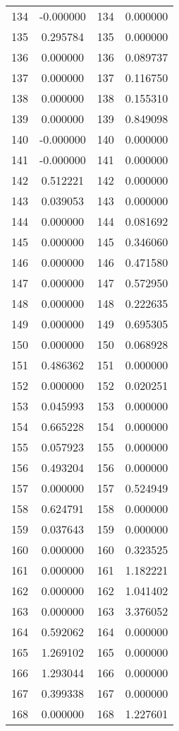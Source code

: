 \documentclass[12pt]{article}
\begin{document}
\begin{longtable}{@{}cccc@{}}
134 & -0.000000 & 134 & 0.000000 \\
135 & 0.295784 & 135 & 0.000000 \\
136 & 0.000000 & 136 & 0.089737 \\
137 & 0.000000 & 137 & 0.116750 \\
138 & 0.000000 & 138 & 0.155310 \\
139 & 0.000000 & 139 & 0.849098 \\
140 & -0.000000 & 140 & 0.000000 \\
141 & -0.000000 & 141 & 0.000000 \\
142 & 0.512221 & 142 & 0.000000 \\
143 & 0.039053 & 143 & 0.000000 \\
144 & 0.000000 & 144 & 0.081692 \\
145 & 0.000000 & 145 & 0.346060 \\
146 & 0.000000 & 146 & 0.471580 \\
147 & 0.000000 & 147 & 0.572950 \\
148 & 0.000000 & 148 & 0.222635 \\
149 & 0.000000 & 149 & 0.695305 \\
150 & 0.000000 & 150 & 0.068928 \\
151 & 0.486362 & 151 & 0.000000 \\
152 & 0.000000 & 152 & 0.020251 \\
153 & 0.045993 & 153 & 0.000000 \\
154 & 0.665228 & 154 & 0.000000 \\
155 & 0.057923 & 155 & 0.000000 \\
156 & 0.493204 & 156 & 0.000000 \\
157 & 0.000000 & 157 & 0.524949 \\
158 & 0.624791 & 158 & 0.000000 \\
159 & 0.037643 & 159 & 0.000000 \\
160 & 0.000000 & 160 & 0.323525 \\
161 & 0.000000 & 161 & 1.182221 \\
162 & 0.000000 & 162 & 1.041402 \\
163 & 0.000000 & 163 & 3.376052 \\
164 & 0.592062 & 164 & 0.000000 \\
165 & 1.269102 & 165 & 0.000000 \\
166 & 1.293044 & 166 & 0.000000 \\
167 & 0.399338 & 167 & 0.000000 \\
168 & 0.000000 & 168 & 1.227601 \\

\end{longtable}
\end{document}

